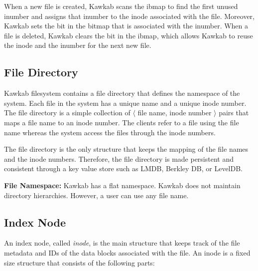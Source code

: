 \documentclass[]{article}
\newcommand{\subtopic}[1]{\vspace{1.5pt} \noindent \textbf{#1}}
\begin{document}
When a new file is created, Kawkab scans the ibmap to find the first unused 
inumber and assigns that inumber to the inode associated with the file. Moreover,
Kawkab sets the bit in the bitmap that is associated with the inumber.
When a file is deleted, Kawkab clears the bit in the ibmap, which allows
Kawkab to reuse the inode and the inumber for the next new file.


\subsection{File Directory} Kawkab filesystem contains a file directory that
defines the namespace of the system.
Each file in the system has a unique name and a unique inode number.  The file
directory is a simple collection of $\langle$ file name, inode number $\rangle$
pairs that maps a file name to an inode number.  The clients refer to a file
using the file name whereas the system access the files through the inode
numbers. 

The file directory is the only structure that keeps the mapping of the file
names and the inode numbers. Therefore, the file directory is made persistent
and consistent through a key value store such as LMDB, Berkley DB, or LevelDB.

\subtopic{File Namespace:} Kawkab has a flat namespace. Kawkab does not maintain
directory hierarchies. However, a user can use any file name.



\subsection{Index Node} An index node, called \textit{inode}, is the main
structure that keeps track of the file metadata and IDs of the data
blocks associated with the file. An inode is a fixed size structure that
consists of the following parts:
\end{document}
